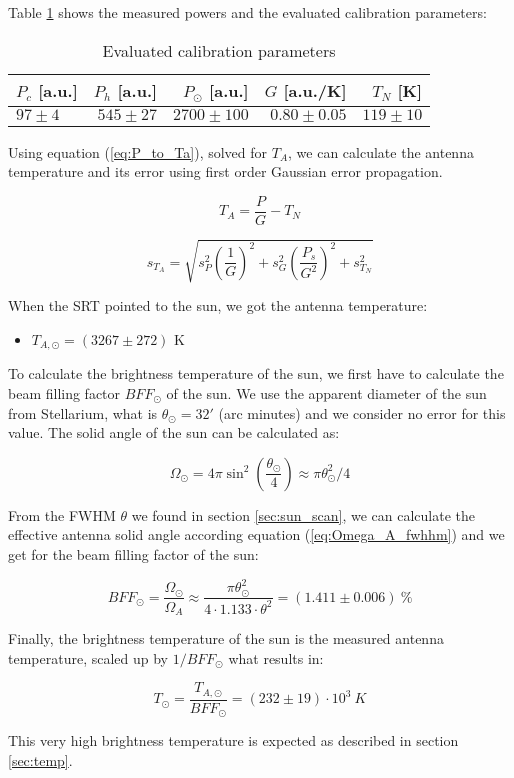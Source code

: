 Table \ref{tab:calib} shows the measured powers and the evaluated calibration parameters:

\begin{table}[H]
\centering
\begin{tabular}{l r  r  r  r }
    \toprule
    $P_c$ [a.u.] & $P_h$ [a.u.]  & $P_\odot$ [a.u.]  & $G$ [a.u./K]    & $T_N$ [K]\\
    \midrule
    $97 \pm 4$   & $545 \pm 27$  & $2700 \pm 100$    & $0.80 \pm 0.05$ & $119 \pm 10$ \\
    \bottomrule
\end{tabular}
\caption{Evaluated calibration parameters}
\label{tab:calib}
\end{table}

Using equation (\ref{eq:P_to_Ta}), solved for $T_A$, we can calculate the antenna temperature and its error using first order Gaussian error propagation.

\begin{equation}
	T_A = \frac{P}{G}-T_N
\end{equation}

\begin{equation}
	s_{T_A} = \sqrt{s_P^{2} \left(\frac{1}{G}\right)^{2} + s_{G}^{2} \left(\frac{P_{s}}{G^{2}}\right)^{2} + s_{T_N}^{2}}
\end{equation}

When the SRT pointed to the sun, we got the antenna temperature:
\begin{itemize}
	\item $T_{A,\odot} = (3267 \pm 272)$ K
\end{itemize}


To calculate the brightness temperature of the sun, we first have to calculate the beam filling factor $BFF_\odot$ of the sun. We use the apparent diameter of the sun from Stellarium, what is $\theta_\odot=32'$ (arc minutes) and we consider no error for this value. The solid angle of the sun can be calculated as:

\begin{equation}
	\Omega_\odot = 4 \pi \sin^2(\frac{\theta_\odot}{4}) \approx \pi \theta_\odot^2/4
\end{equation}

From the FWHM $\theta$ we found in section \ref{sec:sun_scan}, we can calculate the effective antenna solid angle according equation (\ref{eq:Omega_A_fwhhm}) and we get for the beam filling factor of the sun:

\begin{equation}
	BFF_\odot = \frac{\Omega_\odot}{\Omega_A} \approx \frac{\pi \theta_\odot^2}{4 \cdot 1.133 \cdot \theta^2} = (1.411\pm0.006)\ \%
\end{equation}

Finally, the brightness temperature of the sun is the measured antenna temperature, scaled up by $1/BFF_\odot$ what results in:

\begin{equation}
	T_\odot = \frac{T_{A,\odot}}{BFF_\odot} = (232\pm19)\cdot 10^{3}\ \si{K}
\end{equation}

This very high brightness temperature is expected as described in section \ref{sec:temp}.
